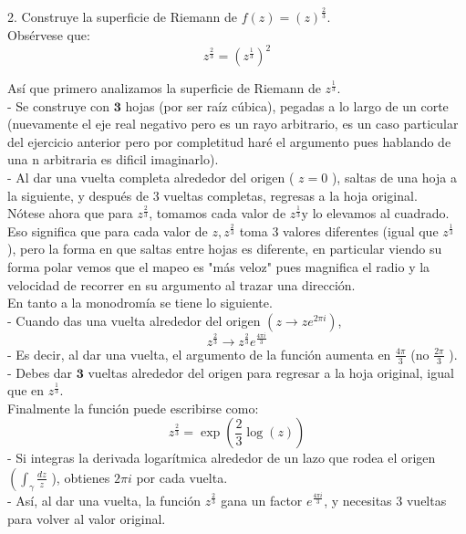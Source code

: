 \documentclass{article}
\theoremstyle{nonumberplain}
\begin{document}
2. Construye la superficie de Riemann de \( f(z)=(z)^{\frac{2}{3}} \). \\

Obsérvese que:
\[
z^{\frac{2}{3}}=\left(z^{\frac{1}{3}}\right)^{2}
\]

Así que primero analizamos la superficie de Riemann de \( z^{\frac{1}{3}} \). \\
- Se construye con \( \mathbf{3} \) hojas (por ser raíz cúbica), pegadas a lo largo de un corte (nuevamente el eje real negativo pero es un rayo arbitrario, es un caso particular del ejercicio anterior pero por completitud haré el argumento pues hablando de una n arbitraria es dificil imaginarlo).  \\
- Al dar una vuelta completa alrededor del origen ( \( z=0 \) ), saltas de una hoja a la siguiente, y después de 3 vueltas completas, regresas a la hoja original. \\

Nótese ahora que para \( z^{\frac{2}{3}} \), tomamos cada valor de \( z^{\frac{1}{3}} \mathrm{y} \) lo elevamos al cuadrado. \\
Eso significa que para cada valor de \( z, z^{\frac{2}{3}} \) toma 3 valores diferentes (igual que \( z^{\frac{1}{3}} \) ), pero la forma en que saltas entre hojas es diferente, en particular viendo su forma polar vemos que el mapeo es "más veloz" pues magnifica el radio y la velocidad de recorrer en su argumento al trazar una dirección. \\

En tanto a la monodromía se tiene lo siguiente. \\
- Cuando das una vuelta alrededor del origen \( \left(z \rightarrow z e^{2 \pi i}\right) \),
\[
z^{\frac{2}{3}} \rightarrow z^{\frac{2}{3}} e^{\frac{4 \pi i}{3}}
\]
- Es decir, al dar una vuelta, el argumento de la función aumenta en \( \frac{4 \pi}{3} \) (no \( \frac{2 \pi}{3} \) ). \\
- Debes dar \( \mathbf{3} \) vueltas alrededor del origen para regresar a la hoja original, igual que en \( z^{\frac{1}{3}} \). \\

Finalmente la función puede escribirse como:
\[
z^{\frac{2}{3}}=\exp \left(\frac{2}{3} \log (z)\right)
\]
- Si integras la derivada logarítmica alrededor de un lazo que rodea el origen \( \left(\int_{\gamma} \frac{d z}{z}\right. \) ), obtienes \( 2 \pi i \) por cada vuelta.\\
- Así, al dar una vuelta, la función \( z^{\frac{2}{3}} \) gana un factor \( e^{\frac{4 \pi i}{3}} \), y necesitas 3 vueltas para volver al valor original. \\
\end{document}
